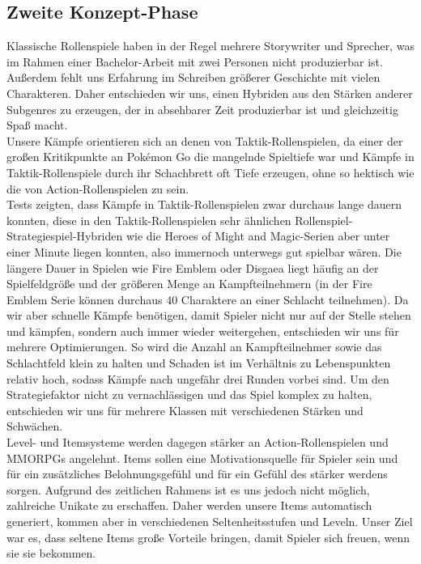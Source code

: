 \documentclass[extern,palatino]{cgBA}
\begin{document}
\subsection{Zweite Konzept-Phase}
Klassische Rollenspiele haben in der Regel mehrere Storywriter und Sprecher, was im Rahmen einer Bachelor-Arbeit mit zwei Personen nicht produzierbar ist. Außerdem fehlt uns Erfahrung im Schreiben größerer Geschichte mit vielen Charakteren. Daher entschieden wir uns, einen Hybriden aus den Stärken anderer Subgenres zu erzeugen, der in absehbarer Zeit produzierbar ist und gleichzeitig Spaß macht. 
\\Unsere Kämpfe orientieren sich an denen von Taktik-Rollenspielen, da einer der großen Kritikpunkte an Pokémon Go die mangelnde Spieltiefe war und Kämpfe in Taktik-Rollenspiele durch ihr Schachbrett oft Tiefe erzeugen, ohne so hektisch wie die von Action-Rollenspielen zu sein. \\Tests zeigten, dass Kämpfe in Taktik-Rollenspielen zwar durchaus lange dauern konnten, diese in den Taktik-Rollenspielen sehr ähnlichen Rollenspiel-Strategiespiel-Hybriden wie die Heroes of Might and Magic-Serien aber unter einer Minute liegen konnten, also immernoch unterwegs gut spielbar wären. Die längere Dauer in Spielen wie Fire Emblem oder Disgaea liegt häufig an der Spielfeldgröße und der größeren Menge an Kampfteilnehmern (in der Fire Emblem Serie können durchaus 40 Charaktere an einer Schlacht teilnehmen). Da wir aber schnelle Kämpfe benötigen, damit Spieler nicht nur auf der Stelle stehen und kämpfen,  sondern auch immer wieder weitergehen, entschieden wir uns für mehrere Optimierungen. So wird die Anzahl an Kampfteilnehmer sowie das Schlachtfeld klein zu halten und Schaden ist im Verhältnis zu Lebenspunkten relativ hoch, sodass Kämpfe nach ungefähr drei Runden vorbei sind. Um den Strategiefaktor nicht zu vernachlässigen und das Spiel komplex zu halten, entschieden wir uns für mehrere Klassen mit verschiedenen Stärken und Schwächen.
\\Level- und Itemsysteme werden dagegen stärker an Action-Rollenspielen und MMORPGs angelehnt. Items sollen eine Motivationsquelle für Spieler sein und für ein zusätzliches Belohnungsgefühl und für ein Gefühl des stärker werdens sorgen. Aufgrund des zeitlichen Rahmens ist es uns jedoch nicht möglich, zahlreiche Unikate zu erschaffen. Daher werden unsere Items automatisch generiert, kommen aber in verschiedenen Seltenheitsstufen und Leveln. Unser Ziel war es, dass seltene Items große Vorteile bringen, damit Spieler sich freuen, wenn sie sie bekommen.
\end{document}
